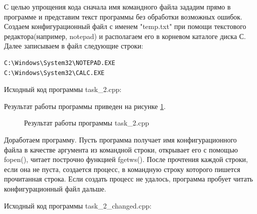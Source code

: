 \documentclass[a4paper]{article}
\begin{document}
	С целью упрощения кода сначала имя командного файла зададим прямо в программе и представим текст программы без обработки возможных ошибок. Создаем конфигурационный файл с именем "temp.txt" при помощи текстового редактора(например, notepad) и располагаем его в корневом каталоге диска С. Далее записываем в файл следующие строки:
	\begin{lstlisting}[style=crs_cpp]
C:\Windows\System32\NOTEPAD.EXE
C:\Windows\System32\CALC.EXE
	\end{lstlisting}
	
	Исходный код программы task\_2.cpp:	
	
	
	Результат работы программы приведен на рисунке \ref{img:task2}.
	\begin{figure}[h!]
		\caption{Результат работы программы task\_2.cpp}
		\label{img:task2}
	\end{figure}
	
	Доработаем программу. Пусть программа получает имя конфигурационного файла в качестве аргумента из командной строки, открывает его с помощью fopen(), читает построчно функцией fgetws(). После прочтения каждой строки, если она не пуста, создается процесс, в командную строку которого пишется прочитанная строка. Если создать процесс не удалось, программа пробует читать конфигурационный файл дальше.
	
		Исходный код программы task\_2\_changed.cpp:
	
	
\end{document}

